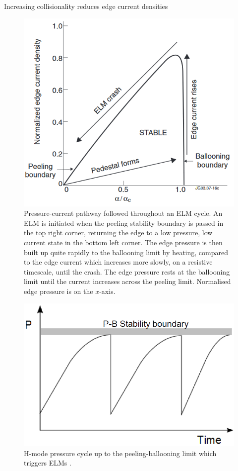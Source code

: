 \documentclass[12pt]{article}  %
\begin{document}
Increasing collisionality reduces edge current densities 

\begin{figure}
\includegraphics[scale=0.5]{Figures/ELMcrash.png}
\centering
\caption{Pressure-current pathway followed throughout an ELM cycle\cite{Perez2004}. An ELM is initiated when the peeling stability boundary is passed in the top right corner, returning the edge to a low pressure, low current state in the bottom left corner. The edge pressure is then built up quite rapidly to the ballooning limit by heating, compared to the edge current which increases more slowly, on a resistive timescale, until the crash. The edge pressure rests at the ballooning limit until the current increases across the peeling limit. Normalised edge pressure is on the $x$-axis.}\label{fig:PBcrash}
\end{figure}

\begin{figure}
\includegraphics[scale=0.3]{Figures/PBboundary.png}
\centering
\caption{H-mode pressure cycle up to the peeling-ballooning limit which triggers ELMs \cite{KirkFF}.}\label{fig:PBboundary}
\end{figure}
\end{document}
